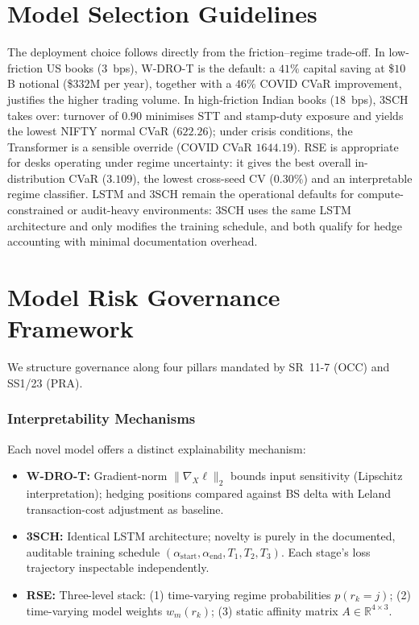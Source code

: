 \documentclass[11pt,oneside]{report}
\newcommand{\R}{\mathbb{R}}
\begin{document}
\section{Model Selection Guidelines}
\label{sec:selection}

The deployment choice follows directly from the friction--regime trade-off. In low-friction US books ($3$~bps), W-DRO-T is the default: a $41\%$ capital saving at \$$10$B notional (\$$332$M per year), together with a $46\%$ COVID CVaR improvement, justifies the higher trading volume. In high-friction Indian books ($18$~bps), 3SCH takes over: turnover of $0.90$ minimises STT and stamp-duty exposure and yields the lowest NIFTY normal CVaR ($622.26$); under crisis conditions, the Transformer is a sensible override (COVID CVaR $1644.19$). RSE is appropriate for desks operating under regime uncertainty: it gives the best overall in-distribution CVaR ($3.109$), the lowest cross-seed CV ($0.30\%$) and an interpretable regime classifier. LSTM and 3SCH remain the operational defaults for compute-constrained or audit-heavy environments: 3SCH uses the same LSTM architecture and only modifies the training schedule, and both qualify for hedge accounting with minimal documentation overhead.

\section{Model Risk Governance Framework}
\label{sec:governance}

We structure governance along four pillars mandated by SR~11-7 (OCC) and SS1/23 (PRA).

\subsubsection{Interpretability Mechanisms}

Each novel model offers a distinct explainability mechanism:
\begin{itemize}[noitemsep]
    \item \textbf{W-DRO-T:} Gradient-norm $\|\nabla_X\ell\|_2$ bounds input sensitivity (Lipschitz interpretation); hedging positions compared against BS delta with Leland transaction-cost adjustment as baseline.
    \item \textbf{3SCH:} Identical LSTM architecture; novelty is purely in the documented, auditable training schedule $(\alpha_{\text{start}}, \alpha_{\text{end}}, T_1, T_2, T_3)$. Each stage's loss trajectory inspectable independently.
    \item \textbf{RSE:} Three-level stack: (1) time-varying regime probabilities $p(r_k=j)$; (2) time-varying model weights $w_m(r_k)$; (3) static affinity matrix $A \in \R^{4 \times 3}$.
\end{itemize}
\end{document}
